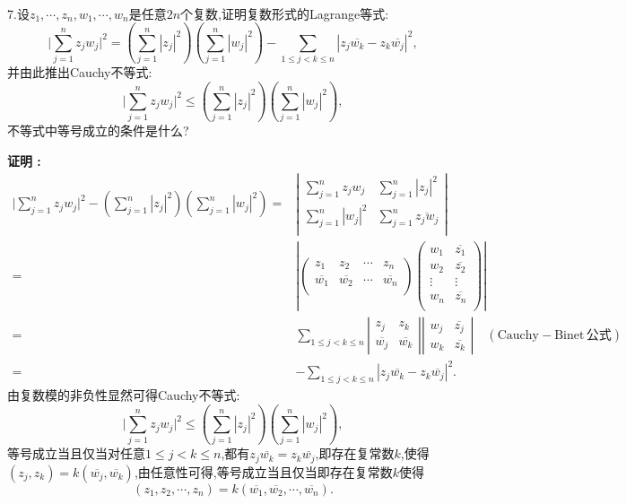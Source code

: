 \documentclass[12pt,fontset=none]{ctexbook}
\newenvironment{proof}[1][]{\par \noindent \textbf{\hspace{2em}证明 \vspace{0.1mm} #1 :}}{\par}
\newcommand{\Lin}[1]{\overline{#1}}
\renewcommand{\rm}[1]{\mathrm{#1}\,}
\begin{document}
\

7.设$z_{1},\cdots,z_{n},w_{1},\cdots,w_{n}$是任意$2n$个复数,证明复数形式的Lagrange等式:
$$\big|\sum\limits_{j=1}^{n}z_{j}w_{j}\big|^{2}=(\sum\limits_{j=1}^{n}|z_{j}|^{2})(\sum\limits_{j=1}^{n}|w_{j}|^{2})-\sum\limits_{1 \leqslant j <k \leqslant n}|z_{j}\Lin{w_{k}}-z_{k}\Lin{w_{j}}|^{2},$$
并由此推出Cauchy不等式:
$$\big|\sum\limits_{j=1}^{n}z_{j}w_{j}\big|^{2} \leqslant (\sum\limits_{j=1}^{n}|z_{j}|^{2})(\sum\limits_{j=1}^{n}|w_{j}|^{2}),$$
不等式中等号成立的条件是什么?
\begin{proof}
    $$
    \begin{aligned}
      \big|\sum\limits_{j=1}^{n}z_{j}w_{j}\big|^{2}-(\sum\limits_{j=1}^{n}|z_{j}|^{2})(\sum\limits_{j=1}^{n}|w_{j}|^{2})= &
      \left|\begin{matrix}
        \sum\limits_{j=1}^{n}z_{j}w_{j} & \sum\limits_{j=1}^{n}|z_{j}|^{2} \\
        \sum\limits_{j=1}^{n}|w_{j}|^{2} & \sum\limits_{j=1}^{n}\Lin{z_{j}w_{j}} \\
      \end{matrix}\right| \\
      =&
      \left|
          \begin{pmatrix}
            z_{1} & z_{2} & \cdots & z_{n} \\
            \Lin{w_{1}} & \Lin{w_{2}} & \cdots & \Lin{w_{n}} \\ 
          \end{pmatrix}
          \begin{pmatrix}
            w_{1} & \Lin{z_{1}} \\
            w_{2} & \Lin{z_{2}} \\
            \vdots & \vdots \\
            w_{n} & \Lin{z_{n}} \\
          \end{pmatrix}
        \right| \\
        = & \sum\limits_{1 \leqslant j < k \leqslant n} 
        \left|\begin{matrix}
            z_{j} & z_{k} \\
            \Lin{w_{j}} & \Lin{w_{k}}
        \end{matrix}\right|
        \left|\begin{matrix}
          w_{j} & \Lin{z_{j}} \\
          w_{k} & \Lin{z_{k}}
      \end{matrix}\right| \quad (\rm{Cauchy-Binet}\text{公式})\\
      =&-\sum\limits_{1 \leqslant j < k \leqslant n}|z_{j}\Lin{w_{k}}-z_{k}\Lin{w_{j}}|^{2}.
    \end{aligned}
    $$
    由复数模的非负性显然可得Cauchy不等式:
    $$\big|\sum\limits_{j=1}^{n}z_{j}w_{j}\big|^{2} \leqslant (\sum\limits_{j=1}^{n}|z_{j}|^{2})(\sum\limits_{j=1}^{n}|w_{j}|^{2}),$$
    等号成立当且仅当对任意$1 \leqslant j < k \leqslant n$,都有$z_{j}\Lin{w_{k}}=z_{k}\Lin{w_{j}}$,即存在复常数$k$,使得$(z_{j},z_{k})=k(\Lin{w_{j}},\Lin{w_{k}})$,由任意性可得,等号成立当且仅当即存在复常数$k$使得
    $$(z_{1},z_{2},\cdots,z_{n})=k(\Lin{w_{1}},\Lin{w_{2}},\cdots,\Lin{w_{n}}).$$
\end{proof}
\end{document}
